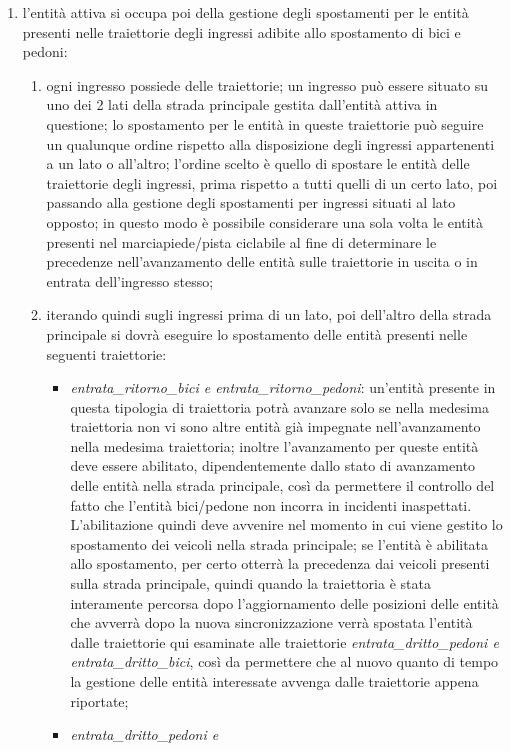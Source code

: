 \begin{enumerate}
\item l'entità attiva si occupa poi della gestione degli spostamenti per le entità presenti nelle traiettorie degli ingressi adibite allo spostamento di bici e pedoni:
\begin{enumerate}
\item ogni ingresso possiede delle traiettorie; un ingresso può essere situato su uno dei 2 lati della strada principale gestita dall'entità attiva in questione; lo spostamento per le entità in queste traiettorie può seguire un qualunque ordine rispetto alla disposizione degli ingressi appartenenti a un lato o all'altro; l'ordine scelto è quello di spostare le entità delle traiettorie degli ingressi, prima rispetto a tutti quelli di un certo lato, poi passando alla gestione degli spostamenti per ingressi situati al lato opposto; in questo modo è possibile considerare una sola volta le entità presenti nel marciapiede/pista ciclabile al fine di determinare le precedenze nell'avanzamento delle entità sulle traiettorie in uscita o in entrata dell'ingresso stesso;
\item iterando quindi sugli ingressi prima di un lato, poi dell'altro della strada principale si dovrà eseguire lo spostamento delle entità presenti nelle seguenti traiettorie:
\begin{itemize}
\item \textit{en\-tra\-ta\_ri\-tor\-no\_bi\-ci e en\-tra\-ta\_ri\-tor\-no\_pe\-do\-ni}: un'entità presente in questa tipologia di traiettoria potrà avanzare solo se nella medesima traiettoria non vi sono altre entità già impegnate nell'avanzamento nella medesima traiettoria; inoltre l'avanzamento per queste entità deve essere abilitato, dipendentemente dallo stato di avanzamento delle entità nella strada principale, così da permettere il controllo del fatto che l'entità bici/pedone non incorra in incidenti inaspettati. L'abilitazione quindi deve avvenire nel momento in cui viene gestito lo spostamento dei veicoli nella strada principale; se l'entità è abilitata allo spostamento, per certo otterrà la precedenza dai veicoli presenti sulla strada principale, quindi quando la traiettoria è stata interamente percorsa dopo l'aggiornamento delle posizioni delle entità che avverrà dopo la nuova sincronizzazione verrà spostata l'entità dalle traiettorie qui esaminate alle traiettorie \textit{en\-tra\-ta\_drit\-to\_pe\-do\-ni e en\-tra\-ta\_drit\-to\_bi\-ci}, così da permettere che al nuovo quanto di tempo la gestione delle entità interessate avvenga dalle traiettorie appena riportate;
\item \textit{en\-tra\-ta\_drit\-to\_pe\-do\-ni e
}
\end{itemize}
\end{enumerate}
\end{enumerate}
